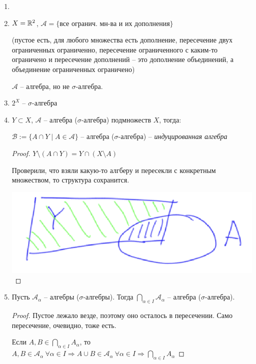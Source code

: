 \begin{example} 
    \begin{enumerate}
        \item[]
        \item $X=\mathbb{R}^2$, $\mathcal{A} = \{\text{все огранич. мн-ва и их дополнения}\}$
        
        (пустое есть, для любого множества есть дополнение, пересечение двух ограниченных ограниченно,
        пересечение ограниченного с каким-то ограничено и пересечение дополнений – это дополнение объединений, а 
        объединение ограниченных ограничено)
        
        $\mathcal{A}$ – алгебра, но не $\sigma$-алгебра.

        \item $2^X$ – $\sigma$-алгебра
        
        \item $Y\subset X$, $\mathcal{A}$ – алгебра ($\sigma$-алгебра) подмножеств $X$, тогда:
        
        $\mathcal{B} := \{ A\cap Y \mid A\in \mathcal{A}\}$ – алгебра ($\sigma$-алгебра) – \textit{индуцированная алгебра}

        \begin{proof}
            $Y \setminus (A\cap Y) = Y \cap (X \setminus A)$

            Проверили, что взяли какую-то алгберу и пересекли с конкретным множеством, то структура сохранится.

            \includegraphics[width=0.3\linewidth]{images/23-09-07-1.png}
        \end{proof}

        \item Пусть $\mathcal{A}_\alpha$ – алгебры ($\sigma$-алгебры). Тогда $\bigcap\limits_{\alpha \in I} \mathcal{A}_\alpha$ – алгебра ($\sigma$-алгебра).
        
        \begin{proof}
            Пустое лежало везде, поэтому оно осталось в пересечении. Само пересечение, очевидно, тоже есть.

            Если $A, B\in \bigcap\limits_{\alpha \in I} A_\alpha$, то $A, B\in \mathcal{A}_\alpha\ \forall \alpha \in I\Rightarrow A\cup B \in \mathcal{A}_\alpha\ \forall \alpha \in I\Rightarrow \bigcap\limits_{\alpha \in I} A_\alpha$
        \end{proof}


\end{enumerate}
\end{example}
